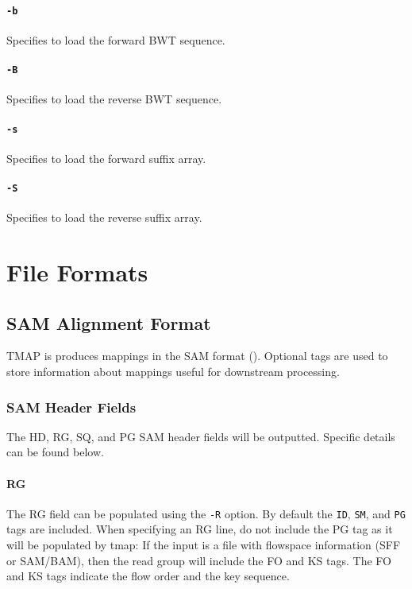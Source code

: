 \documentclass[a4paper,12pt]{book}
\newcommand{\TT}[1]{{\tt #1}} %
\begin{document}
\subsubsection{\TT{-b}}
Specifies to load the forward BWT sequence.

\subsubsection{\TT{-B}}
Specifies to load the reverse BWT sequence.

\subsubsection{\TT{-s}}
Specifies to load the forward suffix array.

\subsubsection{\TT{-S}}
Specifies to load the reverse suffix array.

\chapter{File Formats}

\section{SAM Alignment Format}
\label{sec:samformat}
TMAP is produces mappings in the SAM format (\cite{SAM-format}).
Optional tags are used to store information about mappings useful for downstream processing.

\subsection{SAM Header Fields}

The HD, RG, SQ, and PG SAM header fields will be outputted.
Specific details can be found below.

\subsubsection{RG}
The RG field can be populated using the \TT{-R} option.
By default the \TT{ID}, \TT{SM}, and \TT{PG} tags are included.
When specifying an RG line, do not include the PG tag as it will be populated by tmap:
If the input is a file with flowspace information (SFF or SAM/BAM), then the read group will include the FO and KS tags.
The FO and KS tags indicate the flow order and the key sequence.
\end{document}
